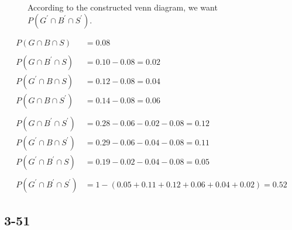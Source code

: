 \documentclass{article}
\begin{document}
		\begin{figure}[!h]
			\centering
			 \par
			According to the constructed venn diagram, we want $P(G^\prime \cap B^\prime \cap S^\prime)$.
		\end{figure}

		\begin{align*}
			P(G \cap B \cap S) &= 0.08 \\\\
			P(G \cap B^\prime \cap S) &= 0.10 - 0.08 = 0.02 \\
			P(G^\prime \cap B \cap S) &= 0.12 - 0.08 = 0.04 \\
			P(G \cap B \cap S^\prime) &= 0.14 - 0.08 = 0.06	\\\\
			P(G \cap B^\prime \cap S^\prime) &= 0.28 - 0.06 - 0.02 - 0.08 = 0.12 \\
			P(G^\prime \cap B \cap S^\prime) &= 0.29 - 0.06 - 0.04 - 0.08 = 0.11 \\
			P(G^\prime \cap B^\prime \cap S) &= 0.19 - 0.02 - 0.04 - 0.08 = 0.05 \\\\
			P(G^\prime \cap B^\prime \cap S^\prime) &= 1 - (0.05 + 0.11 + 0.12 + 0.06 + 0.04 + 0.02) = \boxed{0.52}
		\end{align*}

	\clearpage

	\subsection*{3-51}
\end{document}
